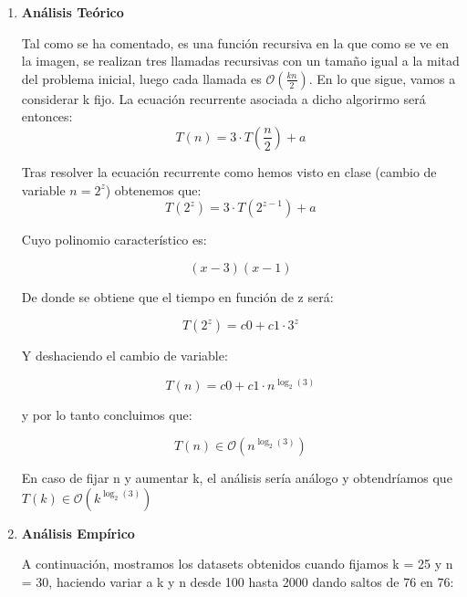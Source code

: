 \documentclass[10pt,a4paper]{article}
\begin{document}
\begin{enumerate}
	\item \textbf{Análisis Teórico}
	
	

Tal como se ha comentado, es una función recursiva en la que como se ve en la imagen, se realizan tres llamadas recursivas con un tamaño igual a la mitad del problema inicial, luego cada llamada es \(\mathcal{O}\left(\frac{kn}{2}\right)\). En lo que sigue, vamos a considerar k fijo. La ecuación recurrente asociada a dicho algorirmo será entonces:
\[
 	T(n)= 3 \cdot T\left(\frac{n}{2}\right) + a
 \]

Tras resolver la ecuación recurrente como hemos visto en clase (cambio de variable $n = 2^z$) obtenemos que: 
\[
 	T(2^z) = 3 \cdot T(2^{z-1}) + a
 \]

Cuyo polinomio característico es:

\[
(x-3)(x-1)
\]

De donde se obtiene que el tiempo en función de z será:

\[
T(2^z) = c0 + c1 \cdot 3^z
\]

Y deshaciendo el cambio de variable:

\[
T(n) = c0 + c1 \cdot n^{\log_{2}(3)}
\]

y por lo tanto concluimos que:

\[
 	T(n) \in \mathcal{O}(n^{\log_{2}(3)})
 \]
 
 En caso de fijar n y aumentar k, el análisis sería análogo y obtendríamos que $T(k) \in \mathcal{O}(k^{\log_{2}(3)})$
 
 \item \textbf{Análisis Empírico}
 
 A continuación, mostramos los datasets obtenidos cuando fijamos k = 25 y n = 30, haciendo variar a k y n desde 100 hasta 2000 dando saltos de 76 en 76:
 
   \begin{table}[h!]
  	\centering
  	\footnotesize
  \end{table}
  

\end{enumerate}
\end{document}
